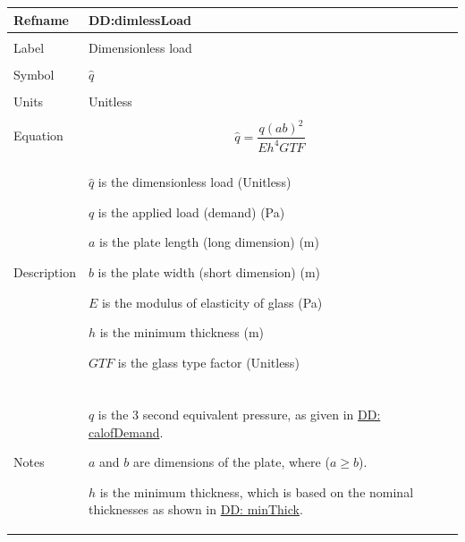 \documentclass[12pt]{article}
\begin{document}
\noindent \begin{minipage}{\textwidth}
\begin{tabular}{>{\raggedright}p{}>{\raggedright\arraybackslash}p{}}
\toprule \textbf{Refname} & \textbf{DD:dimlessLoad}
\label{DD:dimlessLoad}
\\ \midrule \\
Label & Dimensionless load
        
\\ \midrule \\
Symbol & $\hat{q}$
         
\\ \midrule \\
Units & Unitless
        
\\ \midrule \\
Equation & \begin{displaymath}
           \hat{q}=\frac{q \left(a b\right)^{2}}{E h^{4} GTF}
           \end{displaymath}
\\ \midrule \\
Description & \begin{symbDescription}
              \item{$\hat{q}$ is the dimensionless load (Unitless)}
              \item{$q$ is the applied load (demand) (Pa)}
              \item{$a$ is the plate length (long dimension) (m)}
              \item{$b$ is the plate width (short dimension) (m)}
              \item{$E$ is the modulus of elasticity of glass (Pa)}
              \item{$h$ is the minimum thickness (m)}
              \item{$GTF$ is the glass type factor (Unitless)}
              \end{symbDescription}
\\ \midrule \\
Notes & $q$ is the 3 second equivalent pressure, as given in \hyperref[DD:calofDemand]{DD: calofDemand}.
        
        $a$ and $b$ are dimensions of the plate, where ($a\geq{}b$).
        
        $h$ is the minimum thickness, which is based on the nominal thicknesses as shown in \hyperref[DD:minThick]{DD: minThick}.
        

\end{tabular}
\end{minipage}
\end{document}
